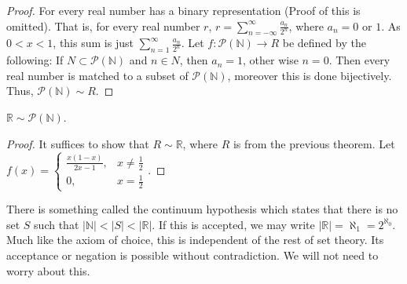 \documentclass[crop=false,class=book,oneside]{standalone}
\begin{document}
            \begin{proof}
            For every real number has a binary representation (Proof of this is omitted). That is, for every real number $r$, $ r = \sum_{n=-\infty}^{\infty} \frac{a_n}{2^n}$, where $a_n = 0$ or $1$. As $0<x<1$, this sum is just $\sum_{n=1}^{\infty} \frac{a_n}{2^n}$. Let $f:\mathcal{P}(\mathbb{N})\rightarrow R$ be defined by the following: If $N\subset \mathcal{P}(\mathbb{N})$ and $n\in N$, then $a_n = 1$, other wise $n=0$. Then every real number is matched to a subset of $\mathcal{P}(\mathbb{N})$, moreover this is done bijectively. Thus, $\mathcal{P}(\mathbb{N})\sim R$.
            \end{proof}
            \begin{theorem}
            $\mathbb{R} \sim \mathcal{P}(\mathbb{N})$.
            \end{theorem}
            \begin{proof}
            It suffices to show that $R\sim \mathbb{R}$, where $R$ is from the previous theorem. Let $f(x) = \begin{cases} \frac{x(1-x)}{2x-1}, & x \ne \frac{1}{2} \\ 0, & x = \frac{1}{2}\end{cases}$.
            \end{proof}
            \begin{remark}
            There is something called the continuum hypothesis which states that there is no set $S$ such that $|\mathbb{N}| < |S| < |\mathbb{R}|$. If this is accepted, we may write $|\mathbb{R}| = \aleph_1 = 2^{\aleph_0}$. Much like the axiom of choice, this is independent of the rest of set theory. Its acceptance or negation is possible without contradiction. We will not need to worry about this.
            \end{remark}
\end{document}
